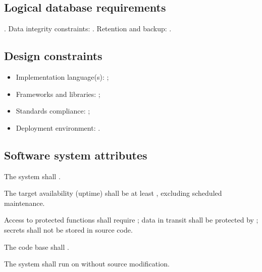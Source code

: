 \documentclass[12pt,a4paper]{extarticle}
\begin{document}
\subsection{Logical database requirements}

. Data integrity constraints: . Retention and backup: .

\subsection{Design constraints}

\begin{itemize}[leftmargin=1.25cm]
    \item Implementation language(s): ;
    \item Frameworks and libraries: ;
    \item Standards compliance: ;
    \item Deployment environment: .
\end{itemize}

\subsection{Software system attributes}

\begin{description}[leftmargin=0cm, style=nextline]
    \item[Reliability] The system shall .
    \item[Availability] The target availability (uptime) shall be at least , excluding scheduled maintenance.
    \item[Security] Access to protected functions shall require ; data in transit shall be protected by ; secrets shall not be stored in source code.
    \item[Maintainability] The code base shall .
    \item[Portability] The system shall run on  without source modification.
\end{description}
\end{document}
